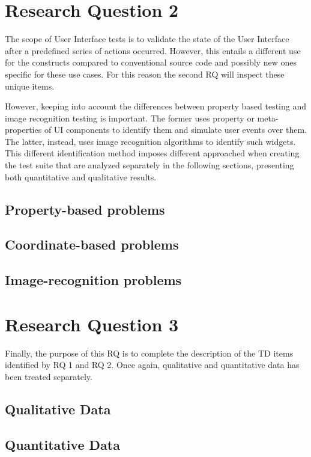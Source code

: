     




\section{Research Question 2}

The scope of User Interface tests is to validate the state of the User Interface after a predefined series of actions occurred. However, this entails a different use for the constructs compared to conventional source code and possibly new ones specific for these use cases. For this reason the second RQ will inspect these unique items.

However, keeping into account the differences between property based testing and image recognition testing is important. The former uses property or meta-properties of UI components to identify them and simulate user events over them. The latter, instead, uses image recognition algorithms to identify such widgets. This different identification method imposes different approached when creating the test suite that are analyzed separately in the following sections, presenting both quantitative and qualitative results.


\subsection{Property-based problems}
    
    

\subsection{Coordinate-based problems}

\subsection{Image-recognition problems}


\section{Research Question 3}

Finally, the purpose of this RQ is to complete the description of the TD items identified by RQ 1 and RQ 2. Once again, qualitative and quantitative data has been treated separately.

\subsection{Qualitative Data}
    

\subsection{Quantitative Data}
    

